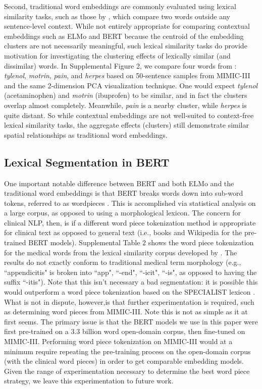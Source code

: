 \documentclass[11pt,a4paper]{article}
\begin{document}
Second, traditional word embeddings are commonly evaluated using lexical similarity tasks, such as those by \cite{pakhomov2010semantic,pakhomov2016corpus}, which compare two words outside any sentence-level context. While not entirely appropriate for comparing contextual embeddings such as ELMo and BERT because the centroid of the embedding clusters are not necessarily meaningful, such lexical similarity tasks do provide motivation for investigating the clustering effects of lexically similar (and dissimilar) words. In Supplemental Figure 2, we compare four words from \cite{pakhomov2016corpus}: \textit{tylenol}, \textit{motrin}, \textit{pain}, and \textit{herpes} based on 50-sentence samples from MIMIC-III and the same 2-dimension PCA visualization technique. One would expect \textit{tylenol} (acetaminophen) and \textit{motrin} (ibuprofen) to be similar, and in fact the clusters overlap almost completely. Meanwhile, \textit{pain} is a nearby cluster, while \textit{herpes} is quite distant. So while contextual embeddings are not well-suited to context-free lexical similarity tasks, the aggregate effects (clusters) still demonstrate similar spatial relationships as traditional word embeddings.


\subsection{Lexical Segmentation in BERT}

One important notable difference between BERT and both ELMo and the traditional word embeddings is that BERT breaks words down into sub-word tokens, referred to as wordpieces \cite{schuster2012japanese}. This is accomplished via statistical analysis on a large corpus, as opposed to using a morphological lexicon. The concern for clinical NLP, then, is if a different word piece tokenization method is appropriate for clinical text as opposed to general text (i.e., books and Wikipedia for the pre-trained BERT models). Supplemental Table 2 shows the word piece tokenization for the medical words from the lexical similarity corpus developed by \cite{pakhomov2016corpus}. The results do not exactly conform to traditional medical term morphology (e.g., ``appendicitis" is broken into ``app", ``-end", ``-icit", ``-is", as opposed to having the suffix ``-itis"). Note that this isn't necessary a bad segmentation: it is possible this would outperform a word piece tokenization based on the SPECIALIST lexicon \cite{browne2000specialist}. What is not in dispute, however,is that further experimentation is required, such as determining word pieces from MIMIC-III. Note this is not as simple as it at first seems. The primary issue is that the BERT models we use in this paper were first pre-trained on a 3.3 billion word open-domain corpus, then fine-tuned on MIMIC-III. Performing word piece tokenization on MIMIC-III would at a minimum require repeating the pre-training process on the open-domain corpus (with the clinical word pieces) in order to get comparable embedding models. Given the range of experimentation necessary to determine the best word piece strategy, we leave this experimentation to future work.
\end{document}
